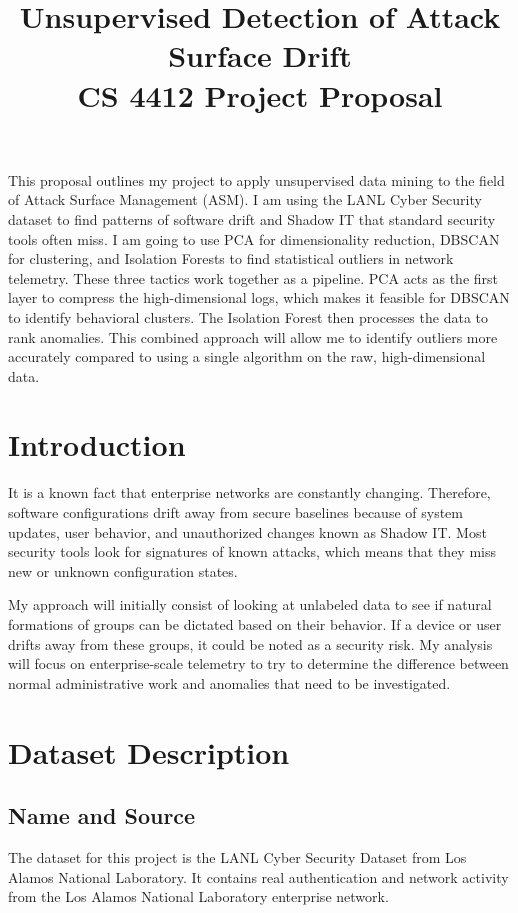\documentclass[conference]{IEEEtran}
\title{Unsupervised Detection of Attack Surface Drift\\
\large CS 4412 Project Proposal}
\author{
\IEEEauthorblockN{Alec Sundby}
\IEEEauthorblockA{
CS4412 ASM Data Mining\\
Kennesaw State University\\
asundby@student.kennesaw.edu
}
}
\begin{document}
\maketitle

This proposal outlines my project to apply unsupervised data mining to the field of Attack Surface Management (ASM). I am using the LANL Cyber Security dataset to find patterns of software drift and Shadow IT that standard security tools often miss. I am going to use PCA for dimensionality reduction, DBSCAN for clustering, and Isolation Forests to find statistical outliers in network telemetry. These three tactics work together as a pipeline. PCA acts as the first layer to compress the high-dimensional logs, which makes it feasible for DBSCAN to identify behavioral clusters. The Isolation Forest then processes the data to rank anomalies. This combined approach will allow me to identify outliers more accurately compared to using a single algorithm on the raw, high-dimensional data.

\section{Introduction}
It is a known fact that enterprise networks are constantly changing. Therefore, software configurations drift away from secure baselines because of system updates, user behavior, and unauthorized changes known as Shadow IT. Most security tools look for signatures of known attacks, which means that they miss new or unknown configuration states.

My approach will initially consist of looking at unlabeled data to see if natural formations of groups can be dictated based on their behavior. If a device or user drifts away from these groups, it could be noted as a security risk. My analysis will focus on enterprise-scale telemetry to try to determine the difference between normal administrative work and anomalies that need to be investigated.

\section{Dataset Description}

\subsection{Name and Source}
The dataset for this project is the LANL Cyber Security Dataset from Los Alamos National Laboratory. It contains real authentication and network activity from the Los Alamos National Laboratory enterprise network.
\end{document}
